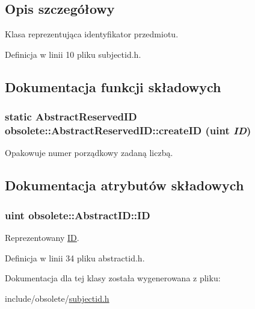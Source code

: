 \subsection{Opis szczegółowy}
Klasa reprezentująca identyfikator przedmiotu. 

Definicja w linii 10 pliku subjectid.h.



\subsection{Dokumentacja funkcji składowych}
\hypertarget{classobsolete_1_1AbstractReservedID_a38fa00bf6097ab9cff285c8480c8097e}{
\subsubsection[{createID}]{\setlength{\rightskip}{0pt plus 5cm}static {\bf AbstractReservedID} obsolete::AbstractReservedID::createID (uint {\em ID})}}
\label{classobsolete_1_1AbstractReservedID_a38fa00bf6097ab9cff285c8480c8097e}


Opakowuje numer porządkowy zadaną liczbą. 



\subsection{Dokumentacja atrybutów składowych}
\hypertarget{classobsolete_1_1AbstractID_a5f67fa1c7d96085f0ef41193b60b570c}{
\subsubsection[{ID}]{\setlength{\rightskip}{0pt plus 5cm}uint {\bf obsolete::AbstractID::ID}}}
\label{classobsolete_1_1AbstractID_a5f67fa1c7d96085f0ef41193b60b570c}


Reprezentowany \hyperlink{classobsolete_1_1ID}{ID}. 



Definicja w linii 34 pliku abstractid.h.



Dokumentacja dla tej klasy została wygenerowana z pliku:\begin{DoxyCompactItemize}
\item 
include/obsolete/\hyperlink{subjectid_8h}{subjectid.h}\end{DoxyCompactItemize}

